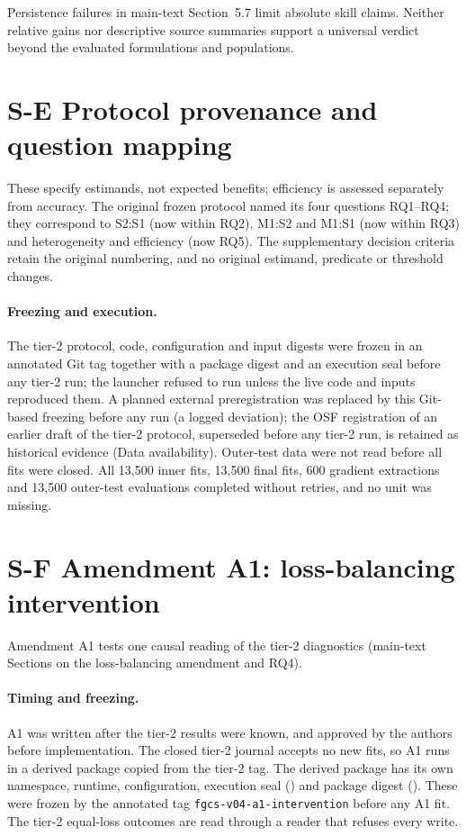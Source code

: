 \documentclass[a4paper,11pt]{article}
\begin{document}
Persistence failures in main-text Section~5.7 limit absolute
skill claims. Neither relative gains nor descriptive source summaries support
a universal verdict beyond the evaluated formulations and populations.

\clearpage
\section*{S-E Protocol provenance and question mapping}
These specify estimands, not expected benefits; efficiency is assessed
separately from accuracy. The original frozen protocol named its four
questions RQ1--RQ4; they correspond to S2:S1 (now within RQ2), M1:S2 and
M1:S1 (now within RQ3) and heterogeneity and efficiency (now RQ5). The
supplementary decision criteria retain the original numbering, and no
original estimand, predicate or threshold changes.

\paragraph{Freezing and execution.} The tier-2 protocol, code, configuration
and input digests were frozen in an annotated Git tag together with a package
digest and an execution seal before any tier-2 run; the launcher refused to
run unless the live code and inputs reproduced them. A planned external
preregistration was replaced by this Git-based freezing before any run
(a logged deviation); the OSF registration of an earlier draft of the tier-2
protocol, superseded before any tier-2 run, is retained as historical evidence
(Data availability). Outer-test
data were not read before all fits were closed. All 13{,}500 inner fits,
13{,}500 final fits, 600 gradient extractions and 13{,}500 outer-test
evaluations completed without retries, and no unit was missing.

\clearpage
\section*{S-F Amendment A1: loss-balancing intervention}
\label{sec:s-f}
Amendment A1 tests one causal reading of the tier-2 diagnostics (main-text Sections on the loss-balancing
amendment and RQ4).

\paragraph{Timing and freezing.} A1 was written after the tier-2 results were known, and approved by the
authors before implementation. The closed tier-2 journal accepts no new fits, so A1 runs in a derived package
copied from the tier-2 tag. The derived package has its own namespace, runtime, configuration, execution seal
(\texttt{}) and package digest
(\texttt{}). These were frozen by
the annotated tag \texttt{fgcs-v04-a1-intervention} before any A1 fit. The tier-2 equal-loss outcomes are read
through a reader that refuses every write.
\end{document}
